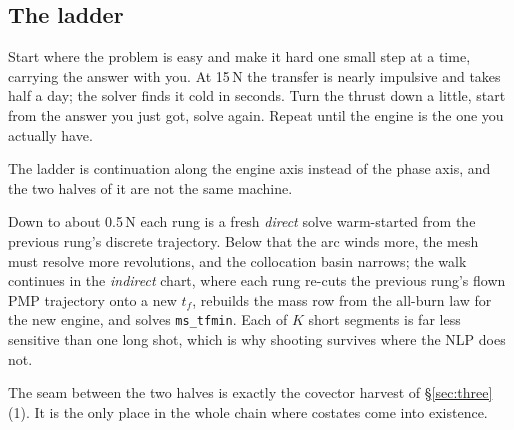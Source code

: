 \documentclass[11pt]{article}
\newcommand{\tf}{t_f}\newcommand{\R}{\mathbb{R}}
\newcommand{\file}[1]{\texttt{#1}}
\begin{document}
\subsection{The ladder}

\begin{eli}
Start where the problem is easy and make it hard one small step at a time,
carrying the answer with you. At 15\,N the transfer is nearly impulsive and
takes half a day; the solver finds it cold in seconds. Turn the thrust down a
little, start from the answer you just got, solve again. Repeat until the
engine is the one you actually have.
\end{eli}

\begin{intu}
The ladder is continuation along the engine axis instead of the phase axis,
and the two halves of it are not the same machine.

Down to about 0.5\,N each rung is a fresh \emph{direct} solve warm-started
from the previous rung's discrete trajectory. Below that the arc winds more,
the mesh must resolve more revolutions, and the collocation basin narrows;
the walk continues in the \emph{indirect} chart, where each rung re-cuts the
previous rung's flown PMP trajectory onto a new $\tf$, rebuilds the mass row
from the all-burn law for the new engine, and solves \file{ms\_tfmin}. Each
of $K$ short segments is far less sensitive than one long shot, which is why
shooting survives where the NLP does not.

The seam between the two halves is exactly the covector harvest of
\S\ref{sec:three}(1). It is the only place in the whole chain where costates
come into existence.
\end{intu}
\end{document}
